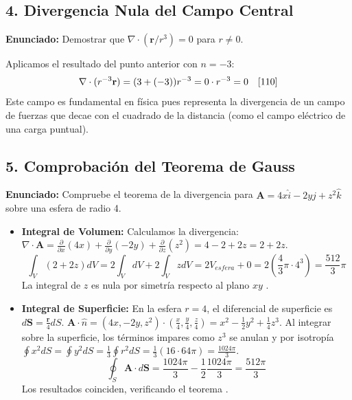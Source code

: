\documentclass[a4paper]{article}
\begin{document}
\subsection*{4. Divergencia Nula del Campo Central}
\textbf{Enunciado:} Demostrar que $\nabla \cdot (\mathbf{r}/r^3) = 0$ para $r \neq 0$.

Aplicamos el resultado del punto anterior con $n = -3$:
\begin{equation*}
    \nabla \cdot (r^{-3} \mathbf{r}) = (3 + (-3))r^{-3} = 0 \cdot r^{-3} = 0 \quad \text{\cite{110}}
\end{equation*}
Este campo es fundamental en física pues representa la divergencia de un campo de fuerzas que decae con el cuadrado de la distancia (como el campo eléctrico de una carga puntual).

\subsection*{5. Comprobación del Teorema de Gauss}
\textbf{Enunciado:} Compruebe el teorema de la divergencia para $\mathbf{A} = 4x\hat{i} - 2y\hat{j} + z^2\hat{k}$ sobre una esfera de radio 4.

\begin{itemize}
    \item \textbf{Integral de Volumen:}
    Calculamos la divergencia: $\nabla \cdot \mathbf{A} = \frac{\partial}{\partial x}(4x) + \frac{\partial}{\partial y}(-2y) + \frac{\partial}{\partial z}(z^2) = 4 - 2 + 2z = 2 + 2z$.
    \begin{equation*}
        \int_V (2 + 2z) dV = 2 \int_V dV + 2 \int_V z dV = 2 V_{esfera} + 0 = 2 \left( \frac{4}{3}\pi \cdot 4^3 \right) = \frac{512}{3} \pi
    \end{equation*}
    La integral de $z$ es nula por simetría respecto al plano $xy$ \cite{91}.
    \item \textbf{Integral de Superficie:}
    En la esfera $r=4$, el diferencial de superficie es $d\mathbf{S} = \frac{\mathbf{r}}{4} dS$.
    $\mathbf{A} \cdot \hat{n} = (4x, -2y, z^2) \cdot (\frac{x}{4}, \frac{y}{4}, \frac{z}{4}) = x^2 - \frac{1}{2}y^2 + \frac{1}{4}z^3$.
    Al integrar sobre la superficie, los términos impares como $z^3$ se anulan y por isotropía $\oint x^2 dS = \oint y^2 dS = \frac{1}{3} \oint r^2 dS = \frac{1}{3} (16 \cdot 64\pi) = \frac{1024\pi}{3}$.
    \begin{equation*}
        \oint_S \mathbf{A} \cdot d\mathbf{S} = \frac{1024\pi}{3} - \frac{1}{2} \frac{1024\pi}{3} = \frac{512\pi}{3}
    \end{equation*}
    Los resultados coinciden, verificando el teorema \cite{91}.
\end{itemize}
\end{document}
